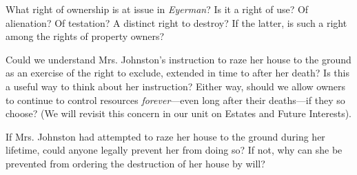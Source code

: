 
\item What right of ownership is at issue in \textit{Eyerman}? Is it a right of
use? Of alienation? Of testation? A distinct right to destroy? If the latter,
is such a right among the rights of property owners?

\item Could we understand Mrs. Johnston's instruction to raze her house to the
ground as an exercise of the right to exclude, extended in time to after her
death? Is this a useful way to think about her instruction? Either way, should
we allow owners to continue to control resources \textit{forever}---even long
after their deaths---if they so choose? (We will revisit this concern in our
unit on Estates and Future Interests).

\item If Mrs. Johnston had attempted to raze her house to the ground during her
lifetime, could anyone legally prevent her from doing so? If not, why can she
be prevented from ordering the destruction of her house by will?

